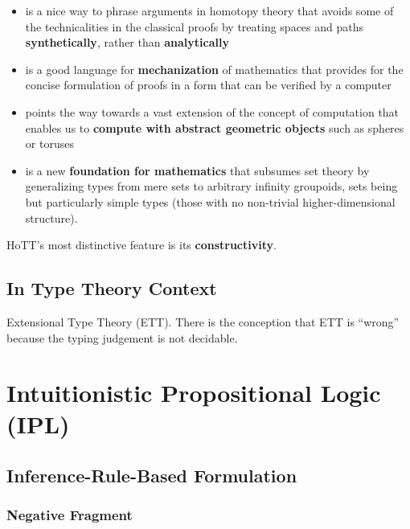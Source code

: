 \documentclass[11pt]{article}
\begin{document}
\begin{itemize}

\item is a nice way to phrase arguments in homotopy theory that avoids some of the technicalities
  in the classical proofs by treating spaces and paths \textbf{synthetically}, rather than
  \textbf{analytically}

\item is a good language for \textbf{mechanization} of mathematics that provides for the concise
  formulation of proofs in a form that can be verified by a computer

\item points the way towards a vast extension of the concept of computation that enables us to
  \textbf{compute with abstract geometric objects} such as spheres or toruses

\item is a new \textbf{foundation for mathematics} that subsumes set theory by generalizing
  types from mere sets to arbitrary infinity groupoids, sets being but particularly simple
  types (those with no non-trivial higher-dimensional structure).

\end{itemize}

HoTT's most distinctive feature is its \textbf{constructivity}.

\subsection{In Type Theory Context}\label{subsec:type_theory_context}

Extensional Type Theory (ETT).  There is the conception that ETT is ``wrong''~\cite{Harper2012}
because the typing judgement is not decidable.

\section{Intuitionistic Propositional Logic (IPL)}\label{sec:ipl}

\subsection{Inference-Rule-Based Formulation}\label{subsec:ipl_rules}


\subsubsection{Negative Fragment}\label{subsubsec:ipl_negfrag}
\end{document}
